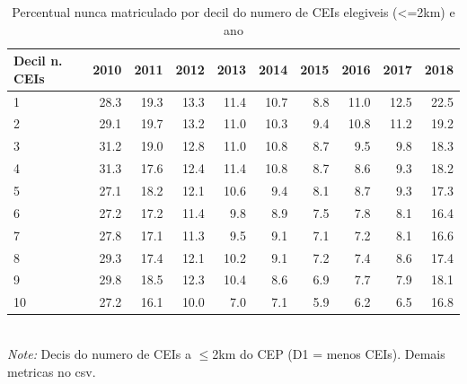 \begin{table}[htbp]\centering
\caption{Percentual nunca matriculado por decil do numero de CEIs elegiveis (<=2km) e ano}
\label{tab:T4c_nelig}
\small
\setlength{\tabcolsep}{4pt}
\begin{tabular}{lrrrrrrrrr}
\toprule
Decil n. CEIs & 2010 & 2011 & 2012 & 2013 & 2014 & 2015 & 2016 & 2017 & 2018 \\
\midrule
1 & 28.3 & 19.3 & 13.3 & 11.4 & 10.7 & 8.8 & 11.0 & 12.5 & 22.5 \\
2 & 29.1 & 19.7 & 13.2 & 11.0 & 10.3 & 9.4 & 10.8 & 11.2 & 19.2 \\
3 & 31.2 & 19.0 & 12.8 & 11.0 & 10.8 & 8.7 & 9.5 & 9.8 & 18.3 \\
4 & 31.3 & 17.6 & 12.4 & 11.4 & 10.8 & 8.7 & 8.6 & 9.3 & 18.2 \\
5 & 27.1 & 18.2 & 12.1 & 10.6 & 9.4 & 8.1 & 8.7 & 9.3 & 17.3 \\
6 & 27.2 & 17.2 & 11.4 & 9.8 & 8.9 & 7.5 & 7.8 & 8.1 & 16.4 \\
7 & 27.8 & 17.1 & 11.3 & 9.5 & 9.1 & 7.1 & 7.2 & 8.1 & 16.6 \\
8 & 29.3 & 17.4 & 12.1 & 10.2 & 9.1 & 7.2 & 7.4 & 8.6 & 17.4 \\
9 & 29.8 & 18.5 & 12.3 & 10.4 & 8.6 & 6.9 & 7.7 & 7.9 & 18.1 \\
10 & 27.2 & 16.1 & 10.0 & 7.0 & 7.1 & 5.9 & 6.2 & 6.5 & 16.8 \\
\bottomrule
\end{tabular}
\\[3pt]{\footnotesize \textit{Note:} Decis do numero de CEIs a $\leq$2km do CEP (D1 = menos CEIs). Demais metricas no csv.}
\end{table}
